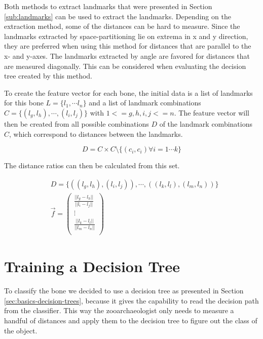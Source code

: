 \documentclass[pdftex,12pt,a4paper]{report}
\begin{document}
Both methods to extract landmarks that were presented in Section \ref{sub:landmarks} can be used to extract the landmarks. Depending on the extraction method, some of the distances can be hard to measure. Since the landmarks extracted by space-partitioning lie on extrema in x and y direction, they are preferred when using this method for distances that are parallel to the x- and y-axes. The landmarks extracted by angle are favored for distances that are measured diagonally. This can be considered when evaluating the decision tree created by this method.

To create the feature vector for each bone, the initial data is a list of landmarks for this bone $L = \{ l_1, \cdots l_n \}$ and a list of landmark combinations $C = \{ (l_g, l_h), \cdots, (l_i, l_j) \}$ with $1 <= g,h,i,j <= n$. The feature vector will then be created from all possible combinations $D$ of the landmark combinations $C$, which correspond to distances between the landmarks.

\begin{equation}
D = C \times C \setminus \{ (c_i, c_i) \forall i = 1 \cdots k \}
\end{equation}

The distance ratios can then be calculated from this set.

\begin{equation}
\begin{split}
& D = \{ ((l_g, l_h), (l_i, l_j)), \cdots, ((l_k, l_l), (l_m, l_n)) \} \\
& \vec{f} = \left( \begin{array}{c}
\frac{||l_g - l_h||}{||l_i - l_j||} \\
\vdots \\
\frac{||l_k - l_l||}{||l_m - l_n||} \\
\end{array} \right)
\end{split}
\end{equation}

\section{Training a Decision Tree}

To classify the bone we decided to use a decision tree as presented in Section \ref{sec:basics-decision-trees}, because it gives the capability to read the decision path from the classifier. This way the zooarchaeologist only needs to measure a handful of distances and apply them to the decision tree to figure out the class of the object.
\end{document}
